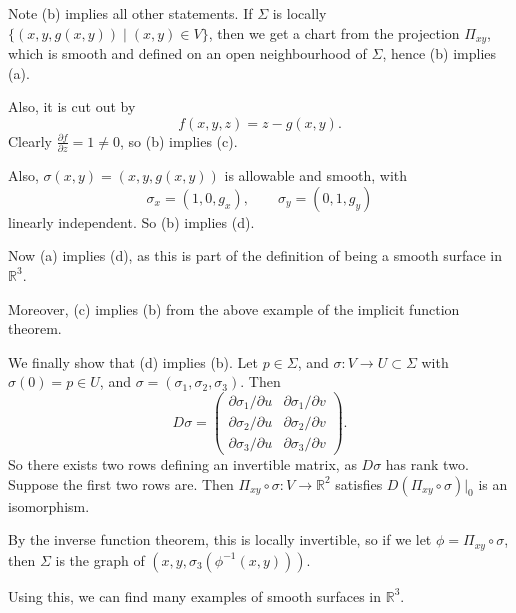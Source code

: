 \documentclass[12pt]{article}
\begin{document}
\begin{proofbox}
	Note (b) implies all other statements. If $\Sigma$ is locally $\{(x, y, g(x, y)) \mid (x, y) \in V\}$, then we get a chart from the projection $\Pi_{xy}$, which is smooth and defined on an open neighbourhood of $\Sigma$, hence (b) implies (a).

	Also, it is cut out by
	\[
	f(x, y, z) = z - g(x, y)
	.\]
	Clearly $\frac{\partial f}{\partial z} = 1 \neq 0$, so (b) implies (c).

	Also, $\sigma(x, y) = (x, y, g(x, y))$ is allowable and smooth, with
	\[
	\sigma_x = (1, 0, g_x), \qquad \sigma_y = (0, 1, g_y)
	\]
	linearly independent. So (b) implies (d).

	Now (a) implies (d), as this is part of the definition of being a smooth surface in $\mathbb{R}^3$.

	Moreover, (c) implies (b) from the above example of the implicit function theorem.

	We finally show that (d) implies (b). Let $p \in \Sigma$, and $\sigma : V \to U \subset \Sigma$ with $\sigma(0) = p \in U$, and $\sigma = (\sigma_1, \sigma_2, \sigma_3)$. Then
	\[
	D\sigma =
	\begin{pmatrix}
		\partial \sigma_1/\partial u & \partial \sigma_1/\partial v \\
		\partial \sigma_2/\partial u & \partial \sigma_2/\partial v \\
	\partial \sigma_3/\partial u & \partial \sigma_3/\partial v
	\end{pmatrix}
	.\]
	So there exists two rows defining an invertible matrix, as $D\sigma$ has rank two. Suppose the first two rows are. Then $\Pi_{xy} \circ \sigma : V \to \mathbb{R}^2$ satisfies $D(\Pi_{xy} \circ \sigma)|_0$ is an isomorphism.

	By the inverse function theorem, this is locally invertible, so if we let $\phi = \Pi_{xy} \circ \sigma$, then $\Sigma$ is the graph of $(x, y, \sigma_3(\phi^{-1}(x, y)))$.
\end{proofbox}

Using this, we can find many examples of smooth surfaces in $\mathbb{R}^3$.
\end{document}
